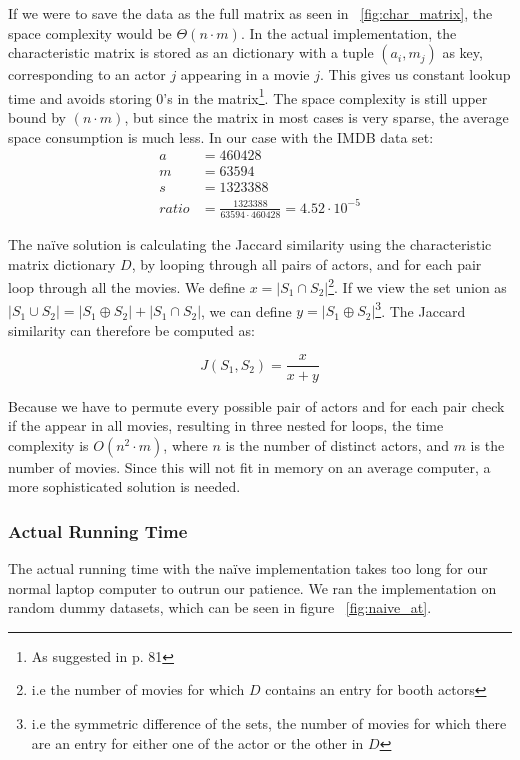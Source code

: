 \documentclass[a4paper,11pt]{article}
\begin{document}
If we were to save the data as the full matrix as seen in ~\ref{fig:char_matrix}, the space complexity would be $\Theta (n \cdot m)$. In the actual implementation,  the characteristic matrix is stored as an dictionary with a tuple $(a_i,m_j)$ as key, corresponding to an actor $j$ appearing in a movie $j$. This gives us constant lookup time and avoids storing 0's in the matrix\footnote{As suggested in \cite{book:mmds} p. 81}. The space complexity is still upper bound by $(n \cdot m)$, but since the matrix in most cases is very sparse, the average space consumption is much less. In our case with the IMDB data set:
\begin{equation}
\begin{aligned}
a &= 460428\\
m &= 63594\\
s &= 1323388\\
ratio &= \frac{1323388}{63594 \cdot 460428} = 4.52\cdot 10^{-5}
\end{aligned}
\end{equation}

The naïve solution  is calculating the Jaccard similarity using the characteristic matrix dictionary $D$, by looping through all pairs of actors, and for each pair loop through all the movies. We define $x = |S_1 \cap S_2|$\footnote{i.e the number of movies for which $D$ contains an entry for booth actors}. If we view the set union as $|S_1 \cup S_2| = |S_1 \oplus S_2| + |S_1 \cap S_2|$, we can define $y = |S_1 \oplus S_2|$\footnote{i.e the symmetric difference of the sets, the number of movies for which there are an entry for either one of the actor or the other in $D$}. The Jaccard similarity can therefore be computed as:

\begin{equation}
J(S_1,S_2) = \frac{x}{x+y}
\end{equation}

Because we have to permute every possible pair of actors and for each pair check if the appear in all movies, resulting in three nested for loops, the time complexity is $O(n^2 \cdot m)$, where $n$ is the number of distinct actors, and $m$ is the number of movies. Since this will not fit in memory on an average computer, a more sophisticated solution is needed. \\

\subsubsection{Actual Running Time}
The actual running time with the naïve implementation takes too long for our normal laptop computer to outrun our patience. We ran the implementation on random dummy datasets, which can be seen in figure ~\ref{fig:naive_at}.
\end{document}
